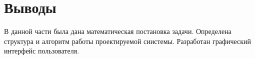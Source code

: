 \section{Выводы} \label{construct_conclusion}

В данной части была дана математическая постановка задачи.
Определена структура и алгоритм работы проектируемой сиистемы. Разработан графический интерфейс пользователя.